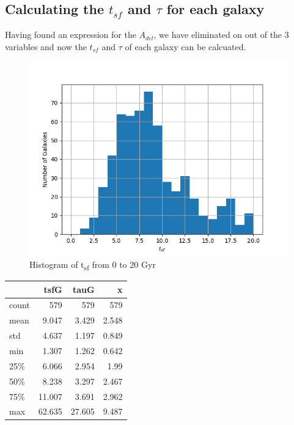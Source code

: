 \documentclass[a4paper,twocolumn]{article}
\begin{document}
\subsection{Calculating the \(t_{sf}\) and \(\tau\) for each galaxy}
\label{sec:org10a2834}

Having found an expression for the \(A_{del}\), we have eliminated on out of the 3 variables and now the \(t_{sf}\) and \(\tau\) of each galaxy can be calcuated.

\begin{figure}[!htpb]
\centering
\includegraphics[width=.9\linewidth]{./figs/tsf-hist.png}
\caption{\label{fig:Histogram of t_{sf} from 0 to 20 Gyr}Histogram of t\textsubscript{sf} from 0 to 20 Gyr}
\end{figure}

\begin{center}
\begin{tabular}{lrrr}
 & tsfG & tauG & x\\[0pt]
\hline
count & 579 & 579 & 579\\[0pt]
mean & 9.047 & 3.429 & 2.548\\[0pt]
std & 4.637 & 1.197 & 0.849\\[0pt]
min & 1.307 & 1.262 & 0.642\\[0pt]
25\% & 6.066 & 2.954 & 1.99\\[0pt]
50\% & 8.238 & 3.297 & 2.467\\[0pt]
75\% & 11.007 & 3.691 & 2.962\\[0pt]
max & 62.635 & 27.605 & 9.487\\[0pt]
\end{tabular}
\end{center}
\end{document}
